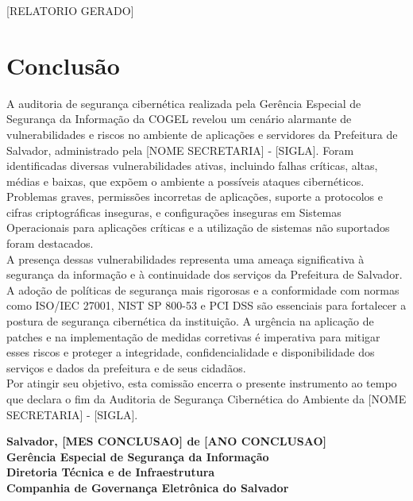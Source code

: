 \documentclass[a4paper,12pt]{article}
\begin{document}
[RELATORIO GERADO]
\section{Conclusão}

A auditoria de segurança cibernética realizada pela Gerência Especial de Segurança da Informação da COGEL revelou um cenário alarmante de vulnerabilidades e riscos no ambiente de aplicações e servidores da Prefeitura de Salvador, administrado pela  [NOME SECRETARIA] - [SIGLA]. Foram identificadas diversas vulnerabilidades ativas, incluindo falhas críticas, altas, médias e baixas, que expõem o ambiente a possíveis ataques cibernéticos. Problemas graves, permissões incorretas de aplicações, suporte a protocolos e cifras criptográficas inseguras, e configurações inseguras em Sistemas Operacionais para aplicações críticas e a utilização de sistemas não suportados foram destacados.\\

A presença dessas vulnerabilidades representa uma ameaça significativa à segurança da informação e à continuidade dos serviços da Prefeitura de Salvador. A adoção de políticas de segurança mais rigorosas e a conformidade com normas como ISO/IEC 27001, NIST SP 800-53 e PCI DSS são essenciais para fortalecer a postura de segurança cibernética da instituição. A urgência na aplicação de patches e na implementação de medidas corretivas é imperativa para mitigar esses riscos e proteger a integridade, confidencialidade e disponibilidade dos serviços e dados da prefeitura e de seus cidadãos.\\

Por atingir seu objetivo, esta comissão encerra o presente instrumento ao tempo que declara o fim da Auditoria de Segurança Cibernética do Ambiente da [NOME SECRETARIA] - [SIGLA].

\newpage

\vspace*{\fill} %
\begin{flushright}
\textbf{Salvador, [MES CONCLUSAO] de [ANO CONCLUSAO] \\%
Gerência Especial de Segurança da Informação \\%
Diretoria Técnica e de Infraestrutura \\%
Companhia de Governança Eletrônica do Salvador}
\end{flushright}
\end{document}
